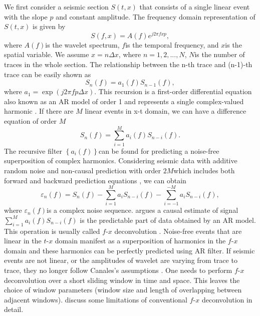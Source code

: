 We first consider a seismic section $S(t,x)$ that consists of a single 
linear event with the slope $p$ and constant amplitude. 
The frequency domain representation of $S(t,x)$ is given by
      \begin{equation}
          S(f,x)=A(f){{e}^{j2\pi fxp}},
        \label{eq:eq1}
      \end{equation} 
where $A(f)$is the wavelet spectrum, $f$is the temporal frequency, 
and $x$is the spatial variable. We assume $x=n\Delta x$, where 
$n=1,2,...,N$, $N$is the number of traces in the whole section. 
The relationship between the n-th trace and (n-1)-th trace can be easily 
shown as
      \begin{equation}
          {{S}_{n}}(f)={{a}_{1}}(f){{S}_{n-1}}(f),
        \label{eq:eq2}
      \end{equation} 
where ${{a}_{1}}=\exp (j2\pi fp\Delta x)$. This recursion is a first-order 
differential equation also known as an AR model of order 1 and represents a 
single complex-valued harmonic \cite[]{Bekara2009}. If there are $M$ linear
events in x-t domain, we can have a difference equation of order $M$ \cite[]{Sacchi2001}
      \begin{equation}
          {{S}_{n}}(f)=\sum\limits_{i=1}^{M}{{{a}_{i}}(f){{S}_{n-i}}(f)}.
        \label{eq:eq3}
      \end{equation} 
The recursive filter $\left\{ {{a}_{i}}(f) \right\}$can be found for predicting a 
noise-free superposition of complex harmonics. Considering seismic data with additive 
random noise and non-causal prediction with order $2M$which includes both forward 
and backward prediction equations \cite[]{Spitz1991, Naghizadeh2009}, we can obtain
      \begin{equation}
         {{\varepsilon }_{n}}(f)={{S}_{n}}(f)-\sum\limits_{i=1}^{M}{{{a}_{i}}{{S}_{n-i}}}(f)-\sum\limits_{i=-1}^{-M}{{{a}_{i}}{{S}_{n-i}}(f)},
        \label{eq:eq4}
      \end{equation} 
where ${{\varepsilon }_{n}}(f)$is a complex noise sequence. \cite{Canales1984} argues 
a causal estimate of signal $\sum\limits_{i=1}^{M}{{{a}_{i}}(f){{S}_{n-i}}(f)}$ 
is the predictable part of data obtained by an AR model. This operation is usually 
called $f$-$x$ deconvolution \cite[]{Gulunay1986}. Noise-free events that are linear in 
the $t$-$x$ domain manifest as a superposition of harmonics in the $f$-$x$ domain and these 
harmonics can be perfectly predicted using AR filter. If seismic events are not linear, 
or the amplitudes of wavelet are varying from trace to trace, they no longer follow 
Canales’s assumptions \cite[]{Canales1984}. One needs to perform $f$-$x$ deconvolution over a 
short sliding window in time and space. This leaves the choice of window parameters 
(window size and length of overlapping between adjacent windows). \cite{Bekara2009} 
discuss some limitations of conventional $f$-$x$ deconvolution in detail.


